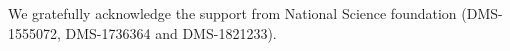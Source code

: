 
%
%



\begin{acknowledgements}
We gratefully acknowledge the support from National Science foundation (DMS-1555072, DMS-1736364 and DMS-1821233).
\end{acknowledgements}





